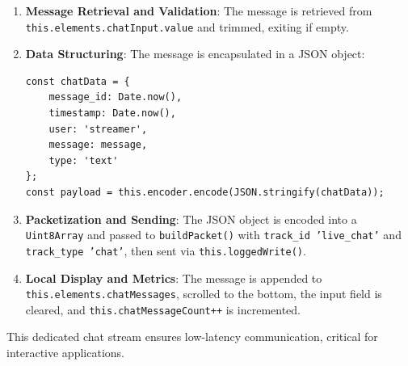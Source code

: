 \begin{enumerate}
    \item \textbf{Message Retrieval and Validation}: The message is retrieved from \texttt{this.elements\allowbreak{}.chatInput.value} and trimmed, exiting if empty.
    \item \textbf{Data Structuring}: The message is encapsulated in a JSON object:
    \begin{lstlisting}[breaklines=true,basicstyle=\small\ttfamily,frame=single]
const chatData = {
    message_id: Date.now(),
    timestamp: Date.now(),
    user: 'streamer',
    message: message,
    type: 'text'
};
const payload = this.encoder.encode(JSON.stringify(chatData));
    \end{lstlisting}
    \item \textbf{Packetization and Sending}: The JSON object is encoded into a \texttt{Uint8Array} and passed to \texttt{buildPacket()} with \texttt{track\_id 'live\_chat'} and \texttt{track\_type 'chat'}, then sent via \texttt{this.loggedWrite()}.
    \item \textbf{Local Display and Metrics}: The message is appended to \texttt{this.elements.chatMe\allowbreak{}ssages}, scrolled to the bottom, the input field is cleared, and \texttt{this.chatMessageCount++} is incremented.
\end{enumerate}

This dedicated chat stream ensures low-latency communication, critical for interactive applications.



